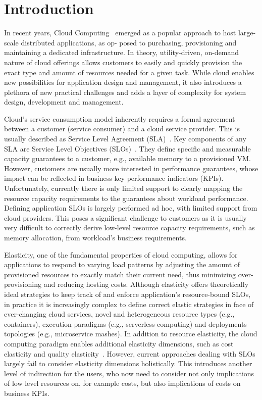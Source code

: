 \section{Introduction}
\label{sec:Introduction}

In recent years, Cloud Computing~\cite{Armbrust:2010ee} emerged as a popular
approach to host large-scale distributed applications, as op-
posed to purchasing, provisioning and maintaining a dedicated
infrastructure. In theory, utility-driven, on-demand nature of cloud
offerings allows customers to easily and quickly provision
the exact type and amount of resources needed for a given
task. While cloud enables new possibilities for application design
and management, it also introduces a plethora of new practical 
challenges and adds a layer of complexity for system design, 
development and management.

Cloud's service consumption model inherently requires a
formal agreement between a customer (service consumer) 
and a cloud service provider. This is usually described as
Service Level Agreement (SLA)~\cite{TODO}. Key components of any
SLA are Service Level Objectives (SLOs)~\cite{TODO}. They define
specific and measurable capacity guarantees to a customer, e.g., available 
memory to a provisioned VM. 
However, customers are usually more interested in performance guarantees, whose
impact can be reflected in business key performance indicators (KPIs). 
Unfortunately, currently there is only limited support to clearly mapping the 
resource capacity requirements to the guarantees 
about workload performance.
Defining application
SLOs is largely performed ad hoc, with limited support from cloud providers. 
This poses a significant challenge to customers as it is
usually very difficult to correctly derive low-level 
resource capacity requirements, such as memory allocation,
from workload's business requirements.


Elasticity, one of the fundamental properties of cloud computing, allows for
applications to respond to varying load patterns by adjusting the amount of
provisioned resources to exactly match their current need, thus minimizing
over-provisioning and reducing hosting costs. 
Although elasticity offers theoretically ideal strategies to keep 
track of and enforce application's resource-bound SLOs, in practice it is 
increasingly complex to define correct elastic strategies in face of
ever-changing cloud services, novel and heterogeneous resource types (e.g., containers),
execution paradigms (e.g., serverless computing) and deployments
topologies (e.g., microservice mashes). 
In addition to resource
elasticity, the cloud computing paradigm enables additional elasticity dimensions, such
as cost elasticity and quality elasticity~\cite{Dustdar:2011dk}. 
However, current approaches dealing with SLOs largely fail to 
consider elasticity dimensions holistically. This introduces another
level of indirection for the users, who now need to consider not only 
implications of low level resources on, for example costs, but also
implications of costs on business KPIs.  

